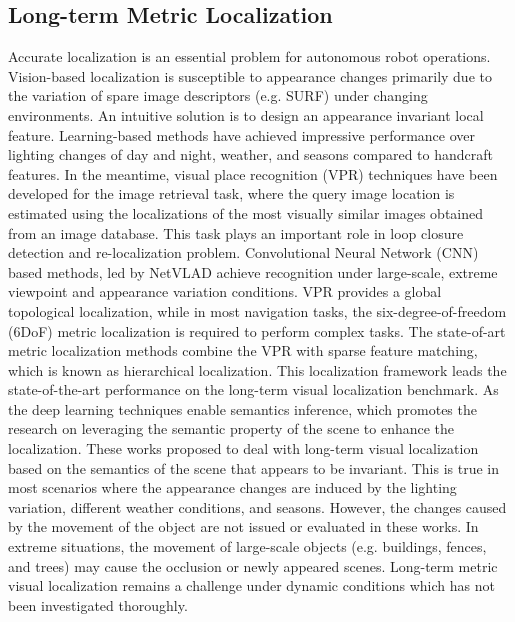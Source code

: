 \subsection{Long-term Metric Localization}
Accurate localization is an essential problem for autonomous robot operations. Vision-based localization is susceptible to appearance changes primarily due to the variation of spare image descriptors (e.g. SURF\cite{bay2008speeded}) under changing environments. An intuitive solution is to design an appearance invariant local feature. Learning-based methods have achieved impressive performance\cite{detone2018superpoint,revaud2019r2d2,sun2021robust,gridseth2021keeping} over lighting changes of day and night, weather, and seasons compared to handcraft features\cite{rublee2011orb,bay2008speeded}. In the meantime, visual place recognition (VPR) techniques have been developed for the image retrieval task, where the query image location is estimated using the localizations of the most visually similar images obtained from an image database. This task plays an important role in loop closure detection and re-localization problem. Convolutional Neural Network (CNN) based methods, led by NetVLAD\cite{arandjelovic2016netvlad} achieve recognition under large-scale, extreme viewpoint and appearance variation conditions. VPR provides a global topological localization, while in most navigation tasks, the six-degree-of-freedom (6DoF) metric localization is required to perform complex tasks. The state-of-art metric localization methods combine the VPR with sparse feature matching\cite{sarlin2019coarse,germain2019sparse,sarlin20superglue}, which is known as hierarchical localization. This localization framework leads the state-of-the-art performance on the long-term visual localization benchmark. As the deep learning techniques enable semantics inference, which promotes the research on leveraging the semantic property of the scene to enhance the localization\cite{larsson2019fine,stenborg2018long,taira2019right,yu2022accurate,7989305}. These works proposed to deal with long-term visual localization based on the semantics of the scene that appears to be invariant. This is true in most scenarios where the appearance changes are induced by the lighting variation, different weather conditions, and seasons. However, the changes caused by the movement of the object are not issued or evaluated in these works. In extreme situations, the movement of large-scale objects (e.g. buildings, fences, and trees) may cause the occlusion or newly appeared scenes. Long-term metric visual localization remains a challenge under dynamic conditions which has not been investigated thoroughly.

